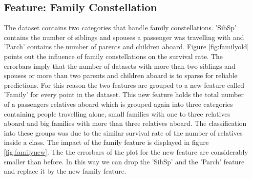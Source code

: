  \subsection*{Feature: Family Constellation}
 The dataset contains two categories that handle family constellations. 'SibSp' contains the number of siblings and spouses a passenger was travelling with and 'Parch' contains the number of parents and children aboard. Figure \ref{fig:familyold} points out the influence of family constellations on the survival rate. The errorbars imply that the number of datasets with more than two siblings and spouses or more than two parents and children aboard is to sparse for reliable predictions. For this reason the two features are grouped to a new feature called 'Family' for every point in the dataset. This new feature holds the total number of a passengers relatives aboard which is grouped again into three categories containing people travelling alone, small families with one to three relatives aboard and big families with more than three relatives aboard. The classification into these groups was due to the similar survival rate of the number of relatives inside a class. The impact of the family feature is displayed in figure \ref{fig:familynew}. The the errorbars of the plot for the new feature are considerably smaller than before. In this way we can drop the 'SibSp' and the 'Parch' feature and replace it by the new family feature.
 
